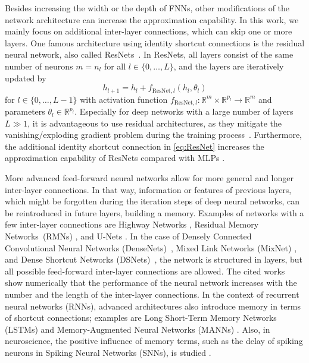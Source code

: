 \documentclass[10pt]{article}
\numberwithin{equation}{section}
\newcommand{\R}{\mathbb{R}}
\begin{document}
	Besides increasing the width or the depth of FNNs,  other modifications of the network architecture can increase the approximation capability. In this work, we mainly focus on additional inter-layer connections, which can skip one or more layers. One famous architecture using identity shortcut connections is the residual neural network, also called ResNets~\cite{He2016}. In ResNets, all layers consist of the same number of neurons $m = n_l$ for all $l \in\{0,\ldots,L\}$, and the layers are iteratively updated by
	\begin{equation} \label{eq:ResNet}
		h_{l+1} = h_{l} + f_{\text{ResNet},l}(h_{l}, \theta_l)
	\end{equation} 
	for $l \in \{0,\ldots,L-1\}$ with activation function   $f_{\text{ResNet},l}:\R^{m}\times \R^{p_l}\rightarrow \R^{m}$ and parameters \mbox{$\theta_l\in \R^{p_l}$.} Especially for deep networks with a large number of layers $L \gg 1$, it is advantageous to use residual architectures, as they mitigate the vanishing/exploding gradient problem during the training process~\cite{Glorot2010,He2016}. Furthermore, the additional identity shortcut connection in \eqref{eq:ResNet} increases the approximation capability of ResNets compared with MLPs \cite{Lin2018}.
	
	More advanced feed-forward neural networks allow for more general and longer inter-layer connections. In that way, information or features of previous layers, which might be forgotten during the iteration steps of deep neural networks, can be reintroduced in future layers, building a memory. Examples of networks with a few inter-layer connections are Highway Networks \cite{Srivastava2015}, Residual Memory Networks~(RMNs) \cite{Baskar2017}, and U-Nets \cite{Ronneberger2015}. In the case of Densely Connected Convolutional Neural Networks (DenseNets)~\cite{Huang2017}, Mixed Link Networks (MixNet) \cite{Wang2018}, and Dense Shortcut Networks (DSNets)~\cite{Zhang2020b}, the network is structured in layers, but all possible feed-forward inter-layer connections are allowed. The cited works show numerically that the performance of the neural network increases with the number and the length of the inter-layer connections. In the context of recurrent neural networks (RNNs), advanced architectures also introduce memory in terms of shortcut connections; examples are Long Short-Term Memory Networks (LSTMs) \cite{Hochreiter1997} and Memory-Augmented Neural Networks (MANNs) \cite{Santoro2016}. Also, in neuroscience, the positive influence of memory terms, such as the delay of spiking neurons in Spiking Neural Networks (SNNs), is studied \cite{DAgostino2023,Masquelier2023, Bohte2016}. 
	
\end{document}
